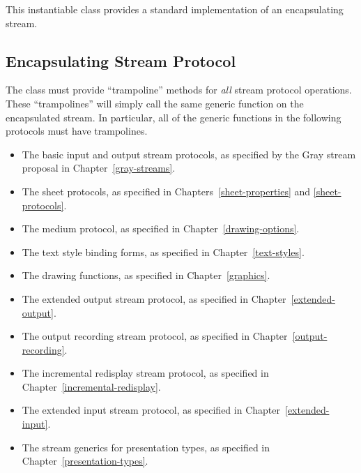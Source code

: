 
This instantiable class provides a standard implementation of an encapsulating
stream.


\subsection {Encapsulating Stream Protocol}

The  class must provide ``trampoline'' methods
for {\sl all} stream protocol operations.  These ``trampolines'' will simply
call the same generic function on the encapsulated stream.  In particular, all
of the generic functions in the following protocols must have trampolines.

\begin{itemize}
\item The basic input and output stream protocols, as specified by the Gray
stream proposal in Chapter~\ref{gray-streams}.

\item The sheet protocols, as specified in Chapters~\ref{sheet-properties} and
\ref{sheet-protocols}.

\item The medium protocol, as specified in Chapter~\ref{drawing-options}.

\item The text style binding forms, as specified in Chapter~\ref{text-styles}.

\item The drawing functions, as specified in Chapter~\ref{graphics}.

\item The extended output stream protocol, as specified in
Chapter~\ref{extended-output}.

\item The output recording stream protocol, as specified in
Chapter~\ref{output-recording}.

\item The incremental redisplay stream protocol, as specified in
Chapter~\ref{incremental-redisplay}.

\item The extended input stream protocol, as specified in
Chapter~\ref{extended-input}.

\item The stream generics for presentation types, as specified in
Chapter~\ref{presentation-types}.
\end{itemize}


